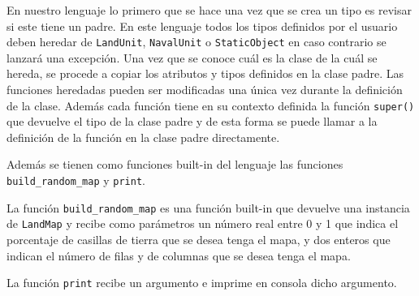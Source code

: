   En nuestro lenguaje lo primero que se hace una vez que se crea un tipo es revisar si este tiene un padre. En este lenguaje todos los tipos definidos por el usuario deben heredar de \verb|LandUnit|, \verb|NavalUnit| o \verb|StaticObject| en caso contrario se lanzará una excepción. Una vez que se conoce cuál es la clase de la cuál se hereda, se procede a copiar los atributos y tipos definidos en la clase padre. Las funciones heredadas pueden ser modificadas una única vez durante la definición de la clase. Además cada función tiene en su contexto definida la función \verb|super()| que devuelve el tipo de la clase padre y de esta forma se puede llamar a la definición de la función en la clase padre directamente.
  
  Adem\'as se tienen como funciones built-in del lenguaje las funciones \verb|build_random_map| y \verb|print|.
  
  La función \verb|build_random_map| es una función built-in que devuelve una instancia de \verb|LandMap| y recibe como parámetros un número
  real entre 0 y 1 que indica el porcentaje de casillas de tierra que se desea tenga el mapa, y dos enteros
  que indican el número de filas y de columnas que se desea tenga el mapa.
  
  La funci\'on \verb|print| recibe un argumento e imprime en consola dicho argumento.

